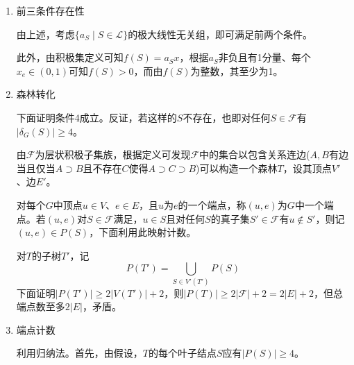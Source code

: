 \documentclass[a4paper,UTF8,fontset=windows]{ctexart}
\begin{document}
{\begin{enumerate}
        然而，由$a_A\notin\mathrm{span}(\mathcal{L})$可知$a_{S_1},a_{S_3}$至少有一个不在$\mathrm{span}(\mathcal{L})$中：
        \begin{itemize}
            \item 若$a_{S_1}\notin\mathrm{span}(\mathcal{L})$，由于$B$与$A$公平相交但$B$不与$S_1$公平相交，只需证明$C\in\mathcal{L}$且$C$与$S_1$公平相交则$A$与$C$公平相交，即与个数最少性矛盾，而这只需要证明$C$不包含于$A$，即$C-A$非空。
            
            利用公平相交性，$S_1\cap C\ne\varnothing$，于是$C-B$非空，但由它们都在$\mathcal{L}$中可知$C$包含$B$\ (此时$B-A\subset C-A$非空)或$C\cap B=\varnothing$\ (此时$C-A=C-S_1$)，均矛盾。

            \item 若$a_{S_3}\notin\mathrm{span}(\mathcal{L})$同上可证。
        \end{itemize}

        若第二式成立可完全类似考虑$S_1,\dots,S_4$证明矛盾，从而推出原结论成立。

        \item 前三条件存在性
        
        由上述，考虑$\{a_S\mid S\in\mathcal{L}\}$的极大线性无关组，即可满足前两个条件。

        此外，由积极集定义可知$f(S)=a_Sx$，根据$a_S$非负且有1分量、每个$x_e\in(0,1)$可知$f(S)>0$，而由$f(S)$为整数，其至少为1。

        \item 森林转化
        
        下面证明条件4成立。反证，若这样的$S$不存在，也即对任何$S\in\mathcal{F}$有$|\delta_G(S)|\ge4$。

        由$\mathcal{F}$为层状积极子集族，根据定义可发现$\mathcal{F}$中的集合以包含关系连边($A,B$有边当且仅当$A\supset B$且不存在$C$使得$A\supset C\supset B$)可以构造一个森林$T$，设其顶点$V'$、边$E'$。

        对每个$G$中顶点$u\in V$、$e\in E$，且$u$为$e$的一个端点，称$(u,e)$为$G$中一个端点。若$(u,e)$对$S\in\mathcal{F}$满足，$u\in S$且对任何$S$的真子集$S'\in\mathcal{F}$有$u\notin S'$，则记$(u,e)\in P(S)$，下面利用此映射计数。

        对$T$的子树$T'$，记
        $$P(T')=\bigcup_{S\in V'(T')}P(S)$$
        下面证明$|P(T')|\ge2|V(T')|+2$，则$|P(T)|\ge 2|\mathcal{F}|+2=2|E|+2$，但总端点数至多$2|E|$，矛盾。

        \item 端点计数

        利用归纳法。首先，由假设，$T$的每个叶子结点$S$应有$|P(S)|\ge4$。
        

\end{enumerate}}
\end{document}
